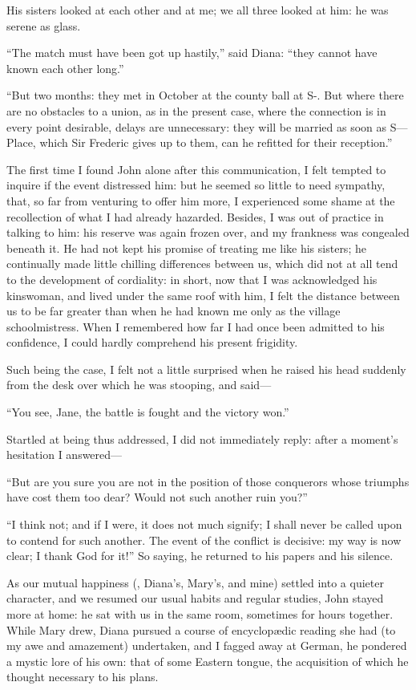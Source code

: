His sisters looked at each other and at me; we all three looked at him:
he was serene as glass.

\enquote{The match must have been got up hastily,} said Diana:
\enquote{they cannot have known each other long.}

\enquote{But two months: they met in October at the county ball at S-.
	But where there are no obstacles to a union, as in the present case,
	where the connection is in every point desirable, delays are
	unnecessary: they will be married as soon as S--- Place, which Sir
	Frederic gives up to them, can he refitted for their reception.}

The first time I found \St{} John alone after this communication, I felt
tempted to inquire if the event distressed him: but he seemed so little
to need sympathy, that, so far from venturing to offer him more, I
experienced some shame at the recollection of what I had already
hazarded. Besides, I was out of practice in talking to him: his reserve
was again frozen over, and my frankness was congealed beneath it. He
had not kept his promise of treating me like his sisters; he continually
made little chilling differences between us, which did not at all tend
to the development of cordiality: in short, now that I was acknowledged
his kinswoman, and lived under the same roof with him, I felt the
distance between us to be far greater than when he had known me only as
the village schoolmistress. When I remembered how far I had once been
admitted to his confidence, I could hardly comprehend his present
frigidity.

Such being the case, I felt not a little surprised when he raised his
head suddenly from the desk over which he was stooping, and said---

\enquote{You see, Jane, the battle is fought and the victory won.}

Startled at being thus addressed, I did not immediately reply: after a
moment's hesitation I answered---

\enquote{But are you sure you are not in the position of those
	conquerors whose triumphs have cost them too dear? Would not such
	another ruin you?}

\enquote{I think not; and if I were, it does not much signify; I shall
	never be called upon to contend for such another. The event of the
	conflict is decisive: my way is now clear; I thank God for it!} So
saying, he returned to his papers and his silence.

As our mutual happiness (\emph{\ie}, Diana's, Mary's, and mine) settled
into a quieter character, and we resumed our usual habits and regular
studies, \St{} John stayed more at home: he sat with us in the same room,
sometimes for hours together. While Mary drew, Diana pursued a course
of encyclopædic reading she had (to my awe and amazement) undertaken,
and I fagged away at German, he pondered a mystic lore of his own: that
of some Eastern tongue, the acquisition of which he thought necessary to
his plans.

